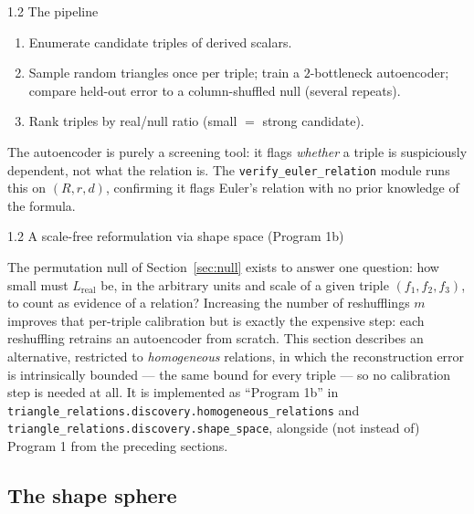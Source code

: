 \documentclass[11pt,reqno]{amsart}
\makeatletter
\renewcommand\section{\@startsection{section}{1}%
  \z@{3\linespacing\@plus1.2\linespacing\@minus.6\linespacing}%
  {1.2\linespacing}%
  {\normalfont\large\scshape\centering}}
\numberwithin{equation}{section}
\theoremstyle{definition}
\theoremstyle{remark}
\makeatother
\begin{document}
\section{The pipeline}
\label{sec:pipeline}

\begin{enumerate}
  \item Enumerate candidate triples of derived scalars.
  \item Sample random triangles once per triple; train a $2$-bottleneck
    autoencoder; compare held-out error to a column-shuffled null (several
    repeats).
  \item Rank triples by real/null ratio (small $=$ strong candidate).
\end{enumerate}
The autoencoder is purely a screening tool: it flags \emph{whether} a triple
is suspiciously dependent, not what the relation is. The
\texttt{verify\_euler\_relation} module runs this on $(R,r,d)$, confirming
it flags Euler's relation with no prior knowledge of the formula.

\section{A scale-free reformulation via shape space (Program 1b)}
\label{sec:shapespace}

The permutation null of Section~\ref{sec:null} exists to answer one
question: how small must $L_{\mathrm{real}}$ be, in the arbitrary units and
scale of a given triple $(f_1,f_2,f_3)$, to count as evidence of a relation?
Increasing the number of reshufflings $m$ improves that per-triple
calibration but is exactly the expensive step: each reshuffling retrains an
autoencoder from scratch. This section describes an alternative, restricted
to \emph{homogeneous} relations, in which the reconstruction error is
intrinsically bounded --- the same bound for every triple --- so no
calibration step is needed at all. It is implemented as ``Program 1b'' in
\texttt{triangle\_relations.discovery.homogeneous\_relations} and
\texttt{triangle\_relations.discovery.shape\_space}, alongside (not instead
of) Program 1 from the preceding sections.

\subsection{The shape sphere}
\end{document}
